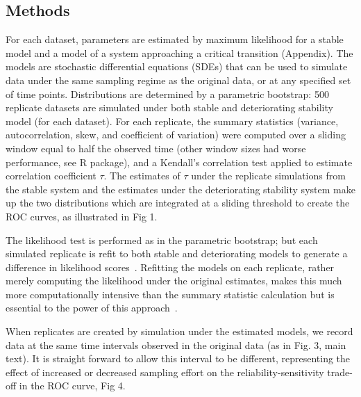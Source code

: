 \documentclass{pnastwo}
\begin{document}
\begin{article}


                             \begin{materials}
                               \subsection{Methods}\label{methods}
For each dataset, parameters are estimated by maximum likelihood for a stable model
and a model of a system approaching a critical transition (Appendix).
The models are stochastic differential equations (SDEs)
that can be used to simulate data under the same sampling regime as the original data, 
or at any specified set of time points.
Distributions are determined by a parametric bootstrap:
500 replicate datasets are simulated under both stable and deteriorating stability model (for each dataset).
For each replicate, the summary statistics (variance, autocorrelation, skew, and coefficient of variation)
were computed over a sliding window equal to half the observed time (other window sizes had worse performance, see R package), 
and a Kendall's correlation test applied to estimate correlation coefficient $\tau$.
The estimates of $\tau$ under the replicate simulations from the stable system
and the estimates under the deteriorating stability system
make up the two distributions which are integrated at a sliding threshold to create the ROC curves, as illustrated in Fig 1. 

The likelihood test is performed as in the parametric bootstrap; 
but each simulated replicate is refit to both stable and deteriorating models to generate a difference in likelihood scores~\cite{Cox1961}.
Refitting the models on each replicate, 
rather merely computing the likelihood under the original estimates,
makes this much more computationally intensive than the summary statistic calculation but is essential to the power of this approach~\cite{Huelsenbeck1996}.

When replicates are created by simulation under the estimated models,
we record data at the same time intervals observed in the original data (as in Fig. 3, main text). 
It is straight forward to allow this interval to be different,
representing the effect of increased or decreased sampling effort on the reliability-sensitivity trade-off in the ROC curve, Fig 4.


\end{materials}
\end{article}
\end{document}
